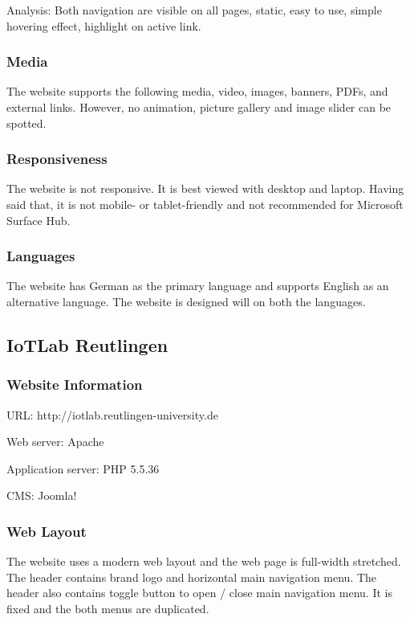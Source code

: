 Analysis: Both navigation are visible on all pages, static, easy to use, simple hovering effect, highlight on active link.

\subsubsection*{Media}
The website supports the following media, video, images, banners, PDFs, and external links. However, no animation, picture gallery and image slider can be spotted.

\subsubsection*{Responsiveness}
The website is not responsive. It is best viewed with desktop and laptop. Having said that, it is not mobile- or tablet-friendly and not recommended for Microsoft Surface Hub.

\subsubsection*{Languages}
The website has German as the primary language and supports English as an alternative language. The website is designed will on both the languages.

\subsection{IoTLab Reutlingen}
\subsubsection*{Website Information}
\begin{itemize*}
\item URL: http://iotlab.reutlingen-university.de
\item Web server: Apache
\item Application server: PHP 5.5.36
\item CMS: Joomla!
\end{itemize*}

\subsubsection*{Web Layout}
The website uses a modern web layout and the web page is full-width stretched. The header contains brand logo and horizontal main navigation menu. The header also contains toggle button to open / close main navigation menu. It is fixed and the both menus are duplicated.

